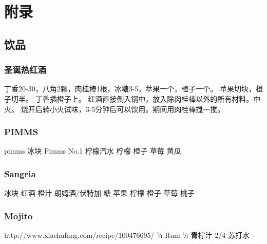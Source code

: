 \chapter*{附录}

\section{饮品}

\subsection{圣诞热红酒}
丁香20-30，八角2颗，肉桂棒1根，冰糖3-5，苹果一个，橙子一个。
苹果切块，橙子切半。
丁香插橙子上。
红酒直接倒入锅中，放入除肉桂棒以外的所有材料。中火。
烧开后转小火试味，3-5分钟后可以饮用。期间用肉桂棒搅一搅。

\subsection{PIMMS}
pimms
冰块
Pimms No.1
柠檬汽水
柠檬
橙子
草莓
黄瓜

\subsection{Sangria}
冰块
红酒
橙汁
朗姆酒/伏特加
糖
苹果
柠檬
橙子
草莓
桃子

\subsection{Mojito}
http://www.xiachufang.com/recipe/100476695/
¼ Rum
¼ 青柠汁
2/4 苏打水

